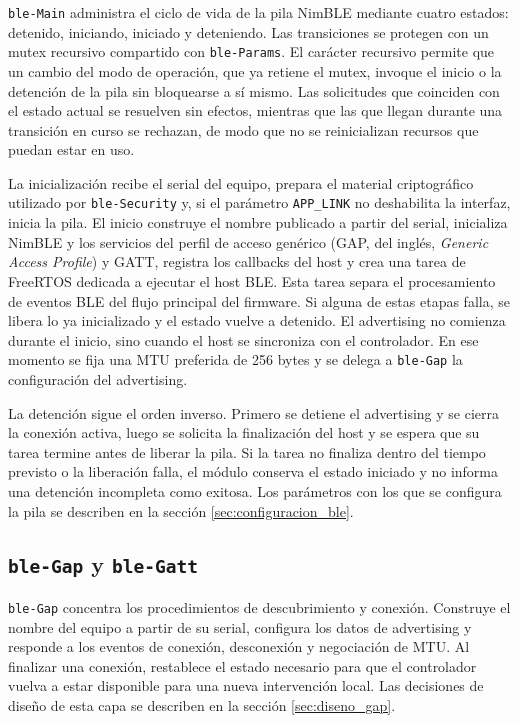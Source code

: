 \texttt{ble-Main} administra el ciclo de vida de la pila NimBLE mediante cuatro estados: detenido, iniciando, iniciado y deteniendo. Las transiciones se protegen con un mutex recursivo compartido con \texttt{ble-Params}. El carácter recursivo permite que un cambio del modo de operación, que ya retiene el mutex, invoque el inicio o la detención de la pila sin bloquearse a sí mismo. Las solicitudes que coinciden con el estado actual se resuelven sin efectos, mientras que las que llegan durante una transición en curso se rechazan, de modo que no se reinicializan recursos que puedan estar en uso.

La inicialización recibe el serial del equipo, prepara el material criptográfico utilizado por \texttt{ble-Security} y, si el parámetro \texttt{APP\_LINK} no deshabilita la interfaz, inicia la pila. El inicio construye el nombre publicado a partir del serial, inicializa NimBLE y los servicios del perfil de acceso genérico (GAP, del inglés, \textit{Generic Access Profile}) y GATT, registra los callbacks del host y crea una tarea de FreeRTOS dedicada a ejecutar el host BLE. Esta tarea separa el procesamiento de eventos BLE del flujo principal del firmware. Si alguna de estas etapas falla, se libera lo ya inicializado y el estado vuelve a detenido. El advertising no comienza durante el inicio, sino cuando el host se sincroniza con el controlador. En ese momento se fija una MTU preferida de 256 bytes y se delega a \texttt{ble-Gap} la configuración del advertising.

La detención sigue el orden inverso. Primero se detiene el advertising y se cierra la conexión activa, luego se solicita la finalización del host y se espera que su tarea termine antes de liberar la pila. Si la tarea no finaliza dentro del tiempo previsto o la liberación falla, el módulo conserva el estado iniciado y no informa una detención incompleta como exitosa. Los parámetros con los que se configura la pila se describen en la sección \ref{sec:configuracion_ble}.

\subsection{\texttt{ble-Gap} y \texttt{ble-Gatt}}

\texttt{ble-Gap} concentra los procedimientos de descubrimiento y conexión. Construye el nombre del equipo a partir de su serial, configura los datos de advertising y responde a los eventos de conexión, desconexión y negociación de MTU. Al finalizar una conexión, restablece el estado necesario para que el controlador vuelva a estar disponible para una nueva intervención local. Las decisiones de diseño de esta capa se describen en la sección \ref{sec:diseno_gap}.

